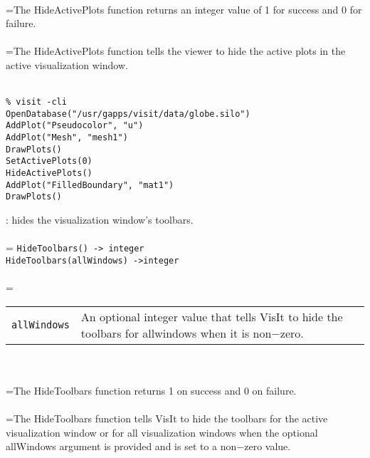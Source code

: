 \documentclass[10pt,a4paper]{report}
\begin{document}
 \\ 
\hangindent=\parindent The HideActivePlots function returns an integer value of 1 for success and 0 for failure. \\[-3mm] 

 \\ 
\hangindent=\parindent The HideActivePlots function tells the viewer to hide the active plots in the active visualization window. \\[-3mm] 

\\[-6mm]
\begin{verbatim}% visit -cli
OpenDatabase("/usr/gapps/visit/data/globe.silo")
AddPlot("Pseudocolor", "u")
AddPlot("Mesh", "mesh1")
DrawPlots()
SetActivePlots(0)
HideActivePlots()
AddPlot("FilledBoundary", "mat1")
DrawPlots()
\end{verbatim}
\newpage


{}
: hides the visualization window's toolbars.\\[-3mm]

 \\ 
\hangindent=\parindent 
\verb!HideToolbars() -> integer!\\ 
\verb!HideToolbars(allWindows) ->integer!\\ [-3mm]

 \\ 
\hangindent=\parindent 
\begin{tabular}{lp{9cm}}
\verb!allWindows! & An optional integer value that tells VisIt to hide the toolbars for allwindows when it is non$-$zero. \\
\end{tabular} \\[-2mm]


 \\ 
\hangindent=\parindent The HideToolbars function returns 1 on success and 0 on failure. \\[-3mm] 

 \\ 
\hangindent=\parindent The HideToolbars function tells VisIt to hide the toolbars for the active visualization window or for all visualization windows when the optional allWindows argument is provided and is set to a non$-$zero value. \\[-3mm] 
\end{document}
